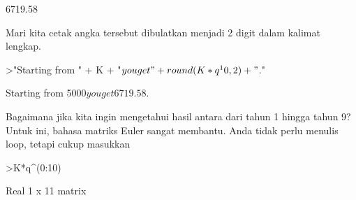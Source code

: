 \documentclass[a4paper,10pt]{article}
\begin{document}
\begin{eulernotebook}
\begin{eulercomment}
\begin{eulercomment}
\begin{eulercomment}
\begin{eulercomment}
\begin{eulercomment}
\begin{eulercomment}
\begin{eulercomment}
\begin{eulercomment}
\begin{euleroutput}
      6719.58 
\end{euleroutput}
\begin{eulercomment}
Mari kita cetak angka tersebut dibulatkan menjadi 2 digit dalam
kalimat lengkap.
\end{eulercomment}
\begin{eulerprompt}
>"Starting from " + K + "$ you get " + round(K*q^10,2) + "$."
\end{eulerprompt}
\begin{euleroutput}
  Starting from 5000$ you get 6719.58$.
\end{euleroutput}
\begin{eulercomment}
Bagaimana jika kita ingin mengetahui hasil antara dari tahun 1 hingga
tahun 9? Untuk ini, bahasa matriks Euler sangat membantu. Anda tidak
perlu menulis loop, tetapi cukup masukkan
\end{eulercomment}
\begin{eulerprompt}
>K*q^(0:10)
\end{eulerprompt}
\begin{euleroutput}
  Real 1 x 11 matrix
  

\end{euleroutput}
\end{eulercomment}
\end{eulercomment}
\end{eulercomment}
\end{eulercomment}
\end{eulercomment}
\end{eulercomment}
\end{eulercomment}
\end{eulercomment}
\end{eulernotebook}
\end{document}
